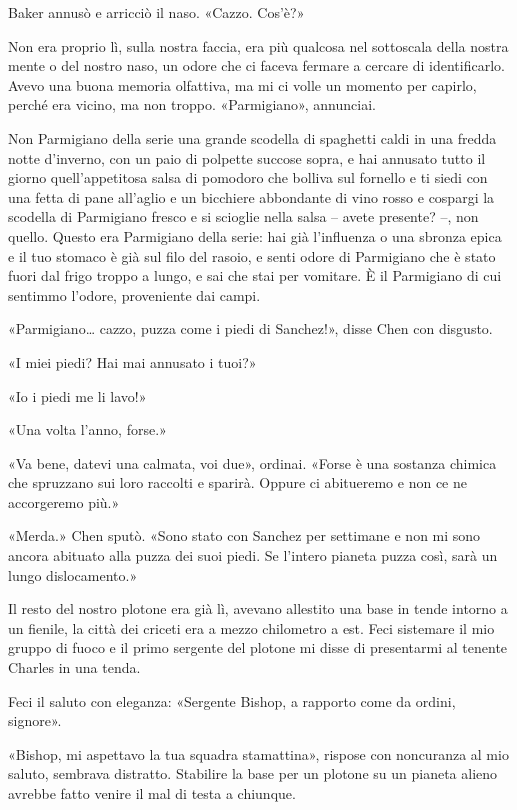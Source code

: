 Baker annusò e arricciò il naso. «Cazzo. Cos'è?»

Non era proprio lì, sulla nostra faccia, era più qualcosa nel sottoscala
della nostra mente o del nostro naso, un odore che ci faceva fermare a
cercare di identificarlo. Avevo una buona memoria olfattiva, ma mi ci
volle un momento per capirlo, perché era vicino, ma non troppo.
«Parmigiano», annunciai.

Non Parmigiano della serie una grande scodella di spaghetti caldi in una
fredda notte d'inverno, con un paio di polpette succose sopra, e hai
annusato tutto il giorno quell'appetitosa salsa di pomodoro che bolliva
sul fornello e ti siedi con una fetta di pane all'aglio e un bicchiere
abbondante di vino rosso e cospargi la scodella di Parmigiano fresco e
si scioglie nella salsa -- avete presente? --, non quello. Questo era
Parmigiano della serie: hai già l'influenza o una sbronza epica e il tuo
stomaco è già sul filo del rasoio, e senti odore di Parmigiano che è
stato fuori dal frigo troppo a lungo, e sai che stai per vomitare. È il
Parmigiano di cui sentimmo l'odore, proveniente dai campi.

«Parmigiano\ldots{} cazzo, puzza come i piedi di Sanchez!», disse Chen
con disgusto.

«I miei piedi? Hai mai annusato i tuoi?»

«Io i piedi me li lavo!»

«Una volta l'anno, forse.»

«Va bene, datevi una calmata, voi due», ordinai. «Forse è una sostanza
chimica che spruzzano sui loro raccolti e sparirà. Oppure ci abitueremo
e non ce ne accorgeremo più.»

«Merda.» Chen sputò. «Sono stato con Sanchez per settimane e non mi sono
ancora abituato alla puzza dei suoi piedi. Se l'intero pianeta puzza
così, sarà un lungo dislocamento.»

\hfill\break

Il resto del nostro plotone era già lì, avevano allestito una base in
tende intorno a un fienile, la città dei criceti era a mezzo chilometro
a est. Feci sistemare il mio gruppo di fuoco e il primo sergente del
plotone mi disse di presentarmi al tenente Charles in una tenda.

Feci il saluto con eleganza: «Sergente Bishop, a rapporto come da
ordini, signore».

«Bishop, mi aspettavo la tua squadra stamattina», rispose con noncuranza
al mio saluto, sembrava distratto. Stabilire la base per un plotone su
un pianeta alieno avrebbe fatto venire il mal di testa a chiunque.

